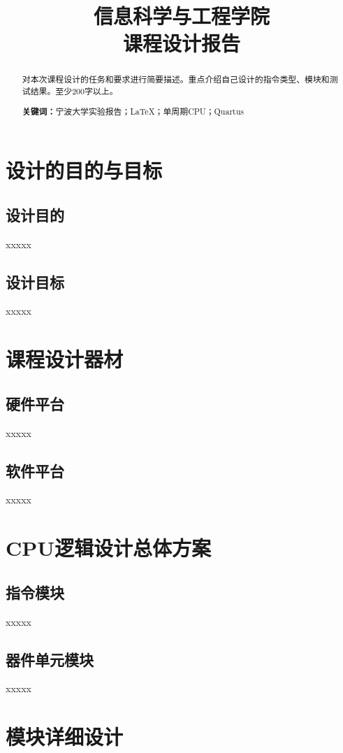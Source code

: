 \documentclass{nbueecs}
\title{信息科学与工程学院\\课程设计报告}
\date{\zhtoday}
\begin{document}
\makecover

\begin{abstract} 
对本次课程设计的任务和要求进行简要描述。重点介绍自己设计的指令类型、模块和测试结果。至少200字以上。
\par\noindent\textbf{关键词：}宁波大学实验报告；\LaTeX；单周期CPU；Quartus
\end{abstract}

\clearpage
\tableofcontents{}

\clearpage
\section{设计的目的与目标}
\subsection{设计目的}
xxxxx
\subsection{设计目标}
xxxxx

\section{课程设计器材}
\subsection{硬件平台}
xxxxx
\subsection{软件平台}
xxxxx

\section{CPU逻辑设计总体方案}
\subsection{指令模块}
xxxxx
\subsection{器件单元模块}
xxxxx

\section{模块详细设计}
\end{document}
